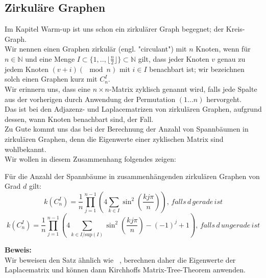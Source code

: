 \subsection{Zirkuläre Graphen}
Im Kapitel Warm-up ist uns schon ein zirkulärer Graph begegnet; der Kreis-Graph.\\
Wir nennen einen Graphen zirkulär (engl. "circulant") mit $n$ Knoten, wenn für $n \in \mathbb{N}$ und eine Menge $I \subset{\{1,..,\lfloor \frac{n}{2} \rfloor \}}\subset{\mathbb{N}}$ gilt, dass jeder Knoten $v$ genau zu jedem Knoten $(v+i) (\mod{n})$ mit $i \in I$ benachbart ist; wir bezeichnen solch einen Graphen kurz mit $C_n^I$.\\
Wir erinnern uns, dass eine $n\times n$-Matrix zyklisch genannt wird, falls jede Spalte aus der vorherigen durch Anwendung der Permutation $(1...n)$ hervorgeht.\\
Das ist bei den Adjazenz- und Laplacematrizen von zirkulären Graphen, aufgrund dessen, wann Knoten benachbart sind, der Fall.\\
Zu Gute kommt uns das bei der Berechnung der Anzahl von Spannbäumen in zirkulären Graphen, denn die Eigenwerte einer zyklischen Matrix sind wohlbekannt.\\
Wir wollen in diesem Zusammenhang folgendes zeigen:
\begin{Tms}
Für die Anzahl der Spannbäume in zusammenhängenden zirkulären Graphen von Grad $d$ gilt:\\
\begin{equation}
\mathit{k}\left( C_n^I \right) = \frac{1}{n} \prod_{j=1}^{n-1} \left(4 \sum_{k \in I} \sin^2 \left( \frac{kj\pi}{n}\right) \right),\,falls\,d\,gerade\,ist
\end{equation}
\begin{equation}
\mathit{k}\left( C_n^I \right) = \frac{1}{n} \prod_{j=1}^{n-1} \left(4 \sum_{k \in I/\mathrm{sup}(I)} \sin^2 \left( \frac{kj\pi}{n}\right)-(-1)^j+1\right),\,falls\,d\,ungerade\,ist
\end{equation}
\end{Tms}
\textbf{Beweis:}\\
Wir beweisen den Satz ähnlich wie ~\cite{wang_yang_1984}, berechnen daher die Eigenwerte der Laplacematrix und können dann Kirchhoffs Matrix-Tree-Theorem anwenden.\\
